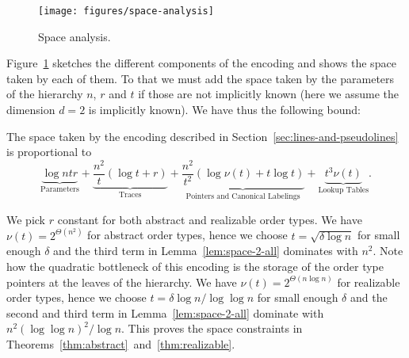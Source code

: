 
\ifeurocg\else%
\begin{figure}
  \centering{}
  \texttt{[image: figures/space-analysis]}
  \caption{Space analysis.}\label{fig:space-analysis}
\end{figure}
\fi

Figure~\ref{fig:space-analysis} sketches the different components of the
encoding and shows the space taken by each of them.
To that we must add the space taken by the
parameters of the hierarchy \(n\), \(r\) and \(t\) if those are not implicitly
known (here we assume the dimension \(d=2\) is implicitly known).
We have thus the following bound:
%
\begin{lemma}\label{lem:space-2-all}
  The space taken by the encoding described in Section~\ref{sec:lines-and-pseudolines} is
  proportional to
    \begin{displaymath}
      \underbrace{\log ntr}_{\text{Parameters}}
      +
      \underbrace{\frac{n^2}{t} ( \log t + r )}_{\text{Traces}}
      +
      \underbrace{\frac{n^2}{t^2} ( \log \nu(t) + t \log t)}_{\text{Pointers and Canonical Labelings}}
      +
      \underbrace{t^3 \nu(t)}_{\text{Lookup Tables}}.
    \end{displaymath}
\end{lemma}

We pick \(r\) constant for both abstract and realizable order types.
%
We have \(\nu(t) = 2^{\Theta(n^2)}\) for abstract order types, hence we
choose \(t = \sqrt{\delta \log n}\) for small enough \(\delta\) and the third
term in Lemma~\ref{lem:space-2-all} dominates with \(n^2\). Note how the
quadratic bottleneck of this encoding is the storage of the order type pointers
at the leaves of the hierarchy.
%
We have \(\nu(t) = 2^{\Theta(n \log n)}\) for realizable order types, hence we
choose \(t = \delta \log n / \log \log n\) for small enough \(\delta\) and the
second and third term in Lemma~\ref{lem:space-2-all} dominate with \(n^2 {(\log
\log n)}^2 / \log n\). This proves the space constraints in
Theorems~\ref{thm:abstract}~and~\ref{thm:realizable}.
